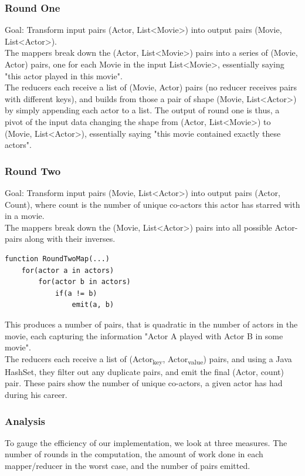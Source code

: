 \documentclass[a4paper,11pt]{article}
\begin{document}
\subsubsection{Round One}
Goal: Transform input pairs (Actor, List<Movie>) into output pairs (Movie, List<Actor>).\\

The mappers break down the (Actor, List<Movie>) pairs into a series of (Movie, Actor) pairs, one for each Movie in the input List<Movie>, essentially saying "this actor played in this movie".\\

The reducers each receive a list of (Movie, Actor) pairs (no reducer receives pairs with different keys), and builds from those a pair of shape (Movie, List<Actor>) by simply appending each actor to a list. The output of round one is thus, a pivot of the input data changing the shape from (Actor, List<Movie>) to (Movie, List<Actor>), essentially saying "this movie contained exactly these actors".

\subsubsection{Round Two}
\label{sub}
Goal: Transform input pairs (Movie, List<Actor>) into output pairs (Actor, Count), where count is the number of unique co-actors this actor has starred with in a movie.\\

The mappers break down the (Movie, List<Actor>) pairs into all possible Actor-pairs along with their inverses.

\begin{verbatim}
function RoundTwoMap(...)
    for(actor a in actors)
        for(actor b in actors)
            if(a != b)
                emit(a, b)
\end{verbatim}

This produces a number of pairs, that is quadratic in the number of actors in the movie, each capturing the information "Actor A played with Actor B in some movie".\\

The reducers each receive a list of (Actor\textsubscript{key}, Actor\textsubscript{value}) pairs, and using a Java HashSet, they filter out any duplicate pairs, and emit the final (Actor, count) pair. These pairs show the number of unique co-actors, a given actor has had during his career.

\subsubsection{Analysis}
To gauge the efficiency of our implementation, we look at three measures. The number of rounds in the computation, the amount of work done in each mapper/reducer in the worst case, and the number of pairs emitted.
\end{document}
